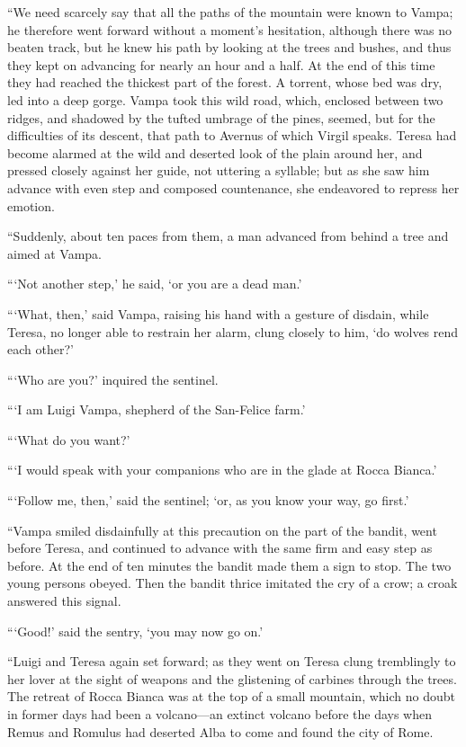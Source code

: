 “We need scarcely say that all the paths of the mountain were known to
Vampa; he therefore went forward without a moment’s hesitation,
although there was no beaten track, but he knew his path by looking at
the trees and bushes, and thus they kept on advancing for nearly an
hour and a half. At the end of this time they had reached the thickest
part of the forest. A torrent, whose bed was dry, led into a deep
gorge. Vampa took this wild road, which, enclosed between two ridges,
and shadowed by the tufted umbrage of the pines, seemed, but for the
difficulties of its descent, that path to Avernus of which Virgil
speaks. Teresa had become alarmed at the wild and deserted look of the
plain around her, and pressed closely against her guide, not uttering a
syllable; but as she saw him advance with even step and composed
countenance, she endeavored to repress her emotion.

“Suddenly, about ten paces from them, a man advanced from behind a tree
and aimed at Vampa.

“‘Not another step,’ he said, ‘or you are a dead man.’

“‘What, then,’ said Vampa, raising his hand with a gesture of disdain,
while Teresa, no longer able to restrain her alarm, clung closely to
him, ‘do wolves rend each other?’

“‘Who are you?’ inquired the sentinel.

“‘I am Luigi Vampa, shepherd of the San-Felice farm.’

“‘What do you want?’

“‘I would speak with your companions who are in the glade at Rocca
Bianca.’

“‘Follow me, then,’ said the sentinel; ‘or, as you know your way, go
first.’

“Vampa smiled disdainfully at this precaution on the part of the
bandit, went before Teresa, and continued to advance with the same firm
and easy step as before. At the end of ten minutes the bandit made them
a sign to stop. The two young persons obeyed. Then the bandit thrice
imitated the cry of a crow; a croak answered this signal.

“‘Good!’ said the sentry, ‘you may now go on.’

“Luigi and Teresa again set forward; as they went on Teresa clung
tremblingly to her lover at the sight of weapons and the glistening of
carbines through the trees. The retreat of Rocca Bianca was at the top
of a small mountain, which no doubt in former days had been a
volcano—an extinct volcano before the days when Remus and Romulus had
deserted Alba to come and found the city of Rome.

